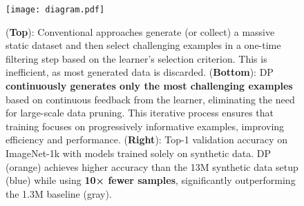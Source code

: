 \begin{figure}[t!]
    \centering
\texttt{[image: diagram.pdf]}
    \vspace{-0.5cm}
    \caption{
    (\textbf{Top}): Conventional approaches generate (or collect) a massive static dataset and then select challenging examples in a one-time filtering step based on the learner’s selection criterion. This is inefficient, as most generated data is discarded. (\textbf{Bottom}): DP \textbf{continuously generates only the most challenging examples} based on continuous feedback from the learner, eliminating the need for large-scale data pruning. This iterative process ensures that training focuses on progressively informative examples, improving efficiency and performance. (\textbf{Right}): Top-1 validation accuracy on ImageNet-1k with models trained solely on synthetic data. DP (orange) achieves higher accuracy than the 13M synthetic data setup (blue) while using \textbf{10× fewer samples}, significantly outperforming the 1.3M baseline (gray).
    }
    \vspace{-0.2cm}
    \label{fig:diagram}
\end{figure}

